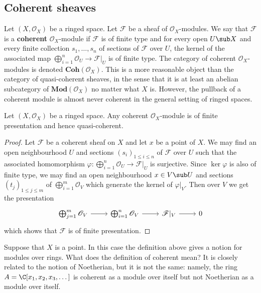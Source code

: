 \subsection{Coherent sheaves}
Let $(X,\mathscr{O}_X)$ be a ringed space. Let $\mathscr{F}$ be a sheaf of $\mathscr{O}_X$-modules. We say that $\mathscr{F}$ is a \textbf{coherent} $\mathscr{O}_X$-module if $\mathscr{F}$ is of finite type and for every open $U\sub X$ and every finite collection $s_1,\dots,s_n$ of sections of $\mathscr{F}$ over $U$, the kernel of the associated map $\bigoplus_{i=1}^{n}\mathscr{O}_U\to\mathscr{F}|_U$ is of finite type. The category of coherent $\mathscr{O}_X$-modules is denoted $\mathbf{Coh}(\mathscr{O}_X)$. This is a more reasonable object than the category of quasi-coherent sheaves, in the sense that it is at least an abelian subcategory of $\mathbf{Mod}(\mathscr{O}_X)$ no matter what $X$ is. However, the pullback of a coherent module is almost never coherent in the general setting of ringed spaces.
\begin{proposition}\label{sheaf of module coh is qcoh and fp}
Let $(X,\mathscr{O}_X)$ be a ringed space. Any coherent $\mathscr{O}_X$-module is of finite presentation and hence quasi-coherent.
\end{proposition}
\begin{proof}
Let $\mathscr{F}$ be a coherent sheaf on $X$ and let $x$ be a point of $X$. We may find an open neighbourhood $U$ and sections $(s_i)_{1\leq i\leq n}$ of $\mathscr{F}$ over $U$ such that the associated homomorphism $\varphi:\bigoplus_{i=1}^{n}\mathscr{O}_U\to\mathscr{F}|_U$ is surjective. Since $\ker\varphi$ is also of finite type, we may find an open neighbourhood $x\in V\sub U$ and sections $(t_j)_{1\leq j\leq m}$ of $\bigoplus_{i=1}^{m}\mathscr{O}_V$ which generate the kernel of $\varphi|_V$. Then over $V$ we get the presentation
\[\begin{tikzcd}
\bigoplus_{j=1}^{m}\mathscr{O}_V\ar[r]&\bigoplus_{i=1}^{n}\mathscr{O}_V\ar[r]&\mathscr{F}|_V\ar[r]&0
\end{tikzcd}\]
which shows that $\mathscr{F}$ is of finite presentation.
\end{proof}
\begin{example}
Suppose that $X$ is a point. In this case the definition above gives a notion for modules over rings. What does the definition of coherent mean? It is closely related to the notion of Noetherian, but it is not the same: namely, the ring $A=\C[x_1,x_2,x_3,\dots]$ is coherent as a module over itself but not Noetherian as a module over itself.
\end{example}
